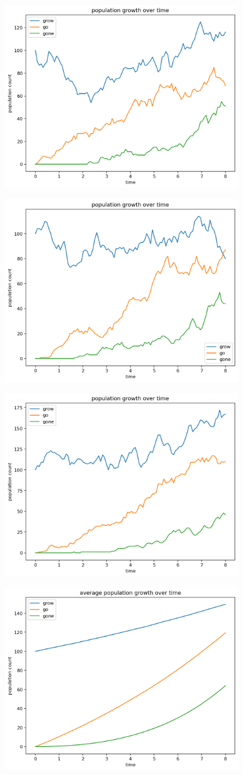 \documentclass{article}
\begin{document}
\includegraphics[width = 4in]{sim3.png}

\includegraphics[width = 4in]{sim4.png}

\includegraphics[width = 4in]{sim5.png}

\includegraphics[width = 4in]{simMean.png}
\end{document}
